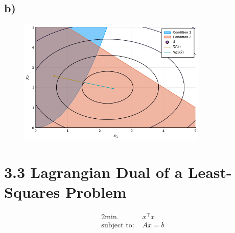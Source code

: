 \documentclass{article}
\begin{document}
\subsection*{b)}
	\begin{figure}[H]
		\includegraphics[width=0.8\textwidth]{3_2.png}
		\caption{}
		\label{fig:2a}
	\end{figure}
\section*{3.3 Lagrangian Dual of a Least-Squares Problem}
	\begin{alignat}{2}
		\text{min. } & x^\top x \\
		\text{subject to: } & Ax=b	
	\end{alignat}
\end{document}
